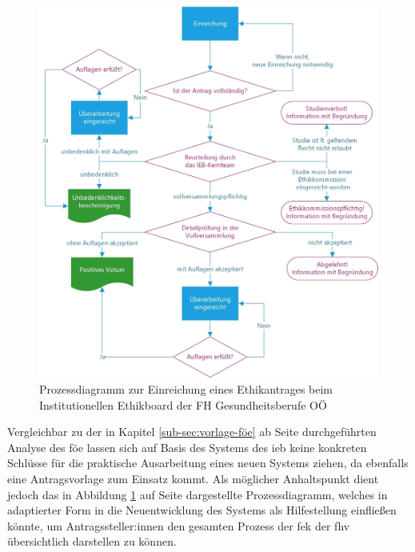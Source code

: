 \documentclass[a4paper,12pt,twoside]{scrreprt}
\begin{document}
\begin{figure}[ht]
    \centering
    \includegraphics[scale=0.15]{thesis/images/FHGOOE_Prozess-Ethikantrag.jpg}
    \caption[Prozessdiagramm zur Einreichung eines Ethikantrages beim Institutionellen Ethikboard der FH Gesundheitsberufe OÖ]{Prozessdiagramm zur Einreichung eines Ethikantrages beim Institutionellen Ethikboard der FH Gesundheitsberufe OÖ \cite{fh_gesundheitsberufe_oo_gmbh_einreichung_2023}}
    \label{fig:prozess-ethikantrag-ieb}
\end{figure}

Vergleichbar zu der in Kapitel \ref{sub-sec:vorlage-föe} ab Seite \pageref{sub-sec:vorlage-föe} durchgeführten Analyse des \ac{föe} lassen sich auf Basis des Systems des \ac{ieb} keine konkreten Schlüsse für die praktische Ausarbeitung eines neuen Systems ziehen, da ebenfalls eine Antragsvorlage zum Einsatz kommt. Als möglicher Anhaltspunkt dient jedoch das in Abbildung \ref{fig:prozess-ethikantrag-ieb} auf Seite \pageref{fig:prozess-ethikantrag-ieb} dargestellte Prozessdiagramm, welches in adaptierter Form in die Neuentwicklung des Systems als Hilfestellung einfließen könnte, um Antragssteller:innen den gesamten Prozess der \ac{fek} der \ac{fhv} übersichtlich darstellen zu können.
\end{document}
